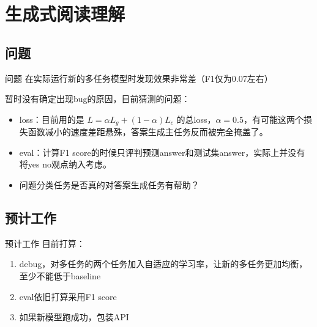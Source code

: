\documentclass{beamer}
\begin{document}
\section{生成式阅读理解}
\subsection{问题}
\begin{frame}[fragile]{问题}
    在实际运行新的多任务模型时发现效果非常差（F1仅为0.07左右）

    暂时没有确定出现bug的原因，目前猜测的问题：

    \begin{itemize}
        \item loss：目前用的是 $L = \alpha L_g + (1 - \alpha)L_c$ 的总loss，$\alpha = 0.5$，有可能这两个损失函数减小的速度差距悬殊，答案生成主任务反而被完全掩盖了。
        \item eval：计算F1 score的时候只评判预测answer和测试集answer，实际上并没有将yes no观点纳入考虑。
        \item 问题分类任务是否真的对答案生成任务有帮助？
    \end{itemize}
\end{frame}

\subsection{ 预计工作}
\begin{frame}[fragile]{ 预计工作}
    目前打算：
    \begin{enumerate}
        \item debug，对多任务的两个任务加入自适应的学习率，让新的多任务更加均衡，至少不能低于baseline
        \item eval依旧打算采用F1 score
        \item 如果新模型跑成功，包装API
    \end{enumerate}
\end{frame}







%     
%     

\end{document}
